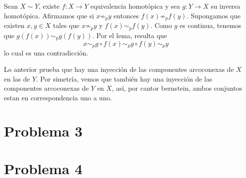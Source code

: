 \documentclass{article}
\begin{document}
\noindent Sean $X\sim Y$, existe $f:X\to Y$ equivalencia homotópica y sea $g:Y\to X$ su inversa 
homotópica. Afirmamos que si $x\not\sim_{p}y$ entonces $f(x)\not\sim_{p}f(y)$. Supongamos que 
existen $x,y\in X$ tales que $x\not\sim_{p}y$ y $f(x)\sim_{p}f(y)$. Como $g$ es continua, tenemos
que $g(f(x))\sim_{p}g(f(y))$. Por el lema, resulta que
\begin{equation*}
    x\sim_{p}g\circ f(x)\sim_{p}g\circ f(y)\sim_{p}y
\end{equation*}
lo cual es una contradicción.

\vspace{2mm}
\noindent Lo anterior prueba que hay una inyección de las componentes arcoconexas de $X$ en las de
$Y$. Por simetría, vemos que también hay una inyección de las componentes arcoconexas de $Y$ en 
$X$, así, por cantor bernstein, ambos conjuntos estan en correspondencia uno a uno.

\section*{Problema 3}

\section*{Problema 4}
\end{document}
